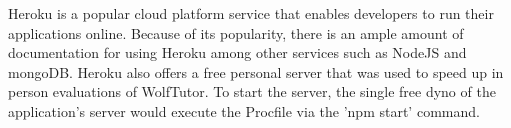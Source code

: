 Heroku is a popular cloud platform service that enables 
developers to run their applications online. Because of its 
popularity, there is an ample amount of documentation for using Heroku among other services such as NodeJS and mongoDB. Heroku also offers a free personal server that was used to speed up
in person evaluations of WolfTutor. To start the server, the single free dyno of the application's server would execute the Procfile via the 'npm start' command.


